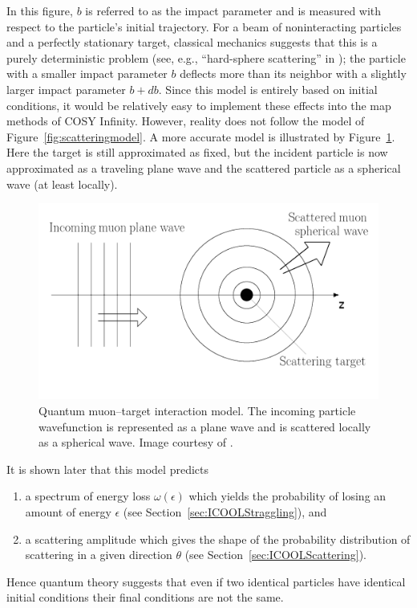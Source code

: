 In this figure, $b$ is referred to as the impact parameter and is measured with respect to the particle's initial trajectory. For a beam of noninteracting particles and a perfectly stationary target, classical mechanics suggests that this is a purely deterministic problem (see, e.g., ``hard-sphere scattering'' in \cite{griffithsqm}); the particle with a smaller impact parameter $b$ deflects more than its neighbor with a slightly larger impact parameter $b+db$. Since this model is entirely based on initial conditions, it would be relatively easy to implement these effects into the map methods of COSY Infinity. However, reality does not follow the model of Figure~\ref{fig:scatteringmodel}. A more accurate model is illustrated by Figure~\ref{fig:scatteringmodel2}. Here the target is still approximated as fixed, but the incident particle is now approximated as a traveling plane wave and the scattered particle as a spherical wave (at least locally).
\begin{figure}
  \centering
    \includegraphics[width=\textwidth]{Figures/scattering_model_2} 
  \caption[Quantum muon--target interaction model.]{Quantum muon--target interaction model. The incoming particle wavefunction is represented as a plane wave and is scattered locally as a spherical wave. Image courtesy of \cite{griffithsqm}.}
  \label{fig:scatteringmodel2}
\end{figure}
It is shown later that this model predicts 
\begin{enumerate}
\item a spectrum of energy loss $\omega(\epsilon)$ which yields the probability of losing an amount of energy $\epsilon$ (see Section~\ref{sec:ICOOLStraggling}), and
\item a scattering amplitude which gives the shape of the probability distribution of scattering in a given direction $\theta$ (see Section~\ref{sec:ICOOLScattering}).
\end{enumerate}
Hence quantum theory suggests that even if two identical particles have identical initial conditions their final conditions are not the same.

